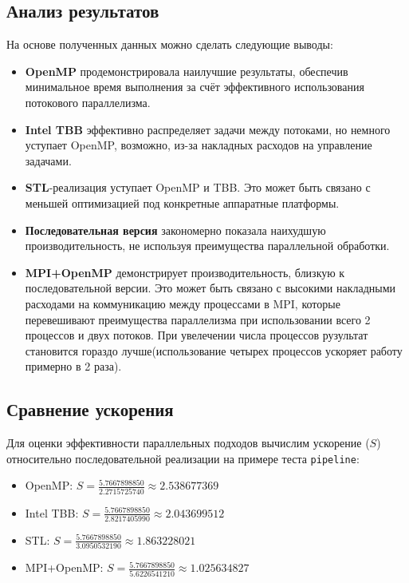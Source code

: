 \documentclass[a4paper,12pt]{article}
\begin{document}
\subsection{Анализ результатов}
На основе полученных данных можно сделать следующие выводы:
\begin{itemize}
    \item \textbf{OpenMP} продемонстрировала наилучшие результаты, обеспечив минимальное время выполнения за счёт эффективного использования потокового параллелизма.
    \item \textbf{Intel TBB} эффективно распределяет задачи между потоками, но немного уступает OpenMP, возможно, из-за накладных расходов на управление задачами.
    \item \textbf{STL}-реализация уступает OpenMP и TBB. Это может быть связано с меньшей оптимизацией под конкретные аппаратные платформы.
    \item \textbf{Последовательная версия} закономерно показала наихудшую производительность, не используя преимущества параллельной обработки.
    \item \textbf{MPI+OpenMP} демонстрирует производительность, близкую к последовательной версии. Это может быть связано с высокими накладными расходами на коммуникацию между процессами в MPI, которые перевешивают преимущества параллелизма при использовании всего 2 процессов и двух потоков. При увелечении числа процессов рузультат становится гораздо лучше(использование четырех процессов ускоряет работу примерно в 2 раза).
\end{itemize}

\subsection{Сравнение ускорения}

Для оценки эффективности параллельных подходов вычислим ускорение ($S$) относительно последовательной реализации на примере теста \texttt{pipeline}:

\begin{itemize}
    \item OpenMP: $S = \frac{5.7667898850}{2.2715725740} \approx 2.538677369$
    \item Intel TBB: $S = \frac{5.7667898850}{2.8217405990} \approx 2.043699512$
    \item STL: $S = \frac{5.7667898850}{3.0950532190} \approx 1.863228021$
    \item MPI+OpenMP: $S = \frac{5.7667898850}{5.6226541210} \approx 1.025634827$
\end{itemize}
\end{document}
